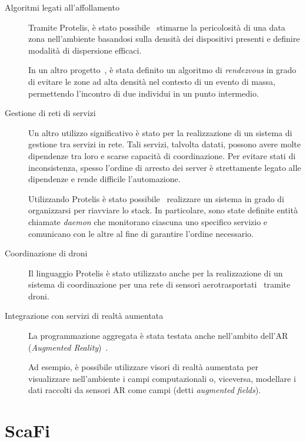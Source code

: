 \begin{description}
  \item[Algoritmi legati all'affollamento]
    Tramite Protelis, è stato possibile~\cite{7274429} stimarne la pericolosità di una data zona nell'ambiente basandosi sulla densità dei dispositivi presenti e definire modalità di dispersione efficaci.

    In un altro progetto~\cite{DBLP:journals/fgcs/CasadeiFPRSV19}, è stata definito un algoritmo di \emph{rendezvous} in grado di evitare le zone ad alta densità nel contesto di un evento di massa, permettendo l'incontro di due individui in un punto intermedio.

  \item[Gestione di reti di servizi]
    Un altro utilizzo significativo è stato per la realizzazione di un sistema di gestione tra servizi in rete.
    Tali servizi, talvolta datati, possono avere molte dipendenze tra loro e scarse capacità di coordinazione.
    Per evitare stati di inconsistenza, spesso l'ordine di arresto dei server è strettamente legato alle dipendenze e rende difficile l'automazione.

    Utilizzando Protelis è stato possibile~\cite{7306601} realizzare un sistema in grado di organizzarsi per riavviare lo stack.
    In particolare, sono state definite entità chiamate \emph{daemon} che monitorano ciascuna uno specifico servizio e comunicano con le altre al fine di garantire l'ordine necessario.

  \item[Coordinazione di droni]
    Il linguaggio Protelis è stato utilizzato anche per la realizzazione di un sistema di coordinazione per una rete di sensori aerotrasportati~\cite{7536289,7789463} tramite droni.

  \item[Integrazione con servizi di realtà aumentata]
    La programmazione aggregata è stata testata anche nell'ambito dell'AR (\emph{Augmented Reality})~\cite{PCRV-SCOPES2015}.

    Ad esempio, è possibile utilizzare visori di realtà aumentata per visualizzare nell'ambiente i campi computazionali
    o, viceversa, modellare i dati raccolti da sensori AR come campi (detti \emph{augmented fields}).
\end{description}

\section{ScaFi}\label{sec:scafi}

